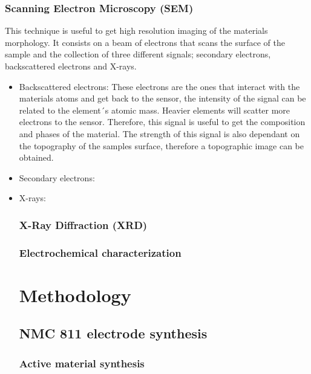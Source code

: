 \documentclass{article}
\begin{document}
\subsubsection{Scanning Electron Microscopy (SEM)}
This technique is useful to get high resolution imaging of the materials morphology.
It consists on a beam of electrons that scans the surface of the sample and the collection of three 
different signals; secondary electrons, backscattered electrons and X-rays. 
\begin {itemize}
\item Backscattered electrons: These electrons are the ones that interact with the materials atoms and get back to
the sensor, the intensity of the signal can be related to the element´s atomic mass. Heavier elements will scatter more electrons
to the sensor. Therefore, this signal is useful to get the composition and phases of the material.
The strength of this signal is also dependant on the topography of the samples surface, therefore a topographic image can be obtained.\\
\item Secondary electrons:
\item X-rays:
\subsubsection{X-Ray Diffraction (XRD)}
\subsubsection{Electrochemical characterization}

\section {Methodology} 
\subsection{NMC 811 electrode synthesis}

\subsubsection{Active material synthesis}


\end{itemize}
\end{document}
